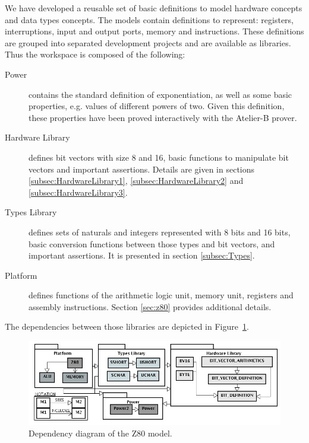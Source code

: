 \documentclass[a4paper]{llncs}
\begin{document}
We have developed a reusable set of basic definitions to model
hardware concepts and data types concepts. The models contain
definitions to represent: registers, interruptions, input and
output ports, memory and instructions. These definitions are grouped
into separated development projects and are available as libraries.
Thus the workspace is composed of the following: 
\begin{description}

\item[Power] contains the standard definition of exponentiation, as
  well as some basic properties, e.g. values of different powers of
  two. Given this definition, these properties have been proved
  interactively with the Atelier-B prover.

\item[Hardware Library] defines bit vectors with size 8 and 16, basic
  functions to manipulate bit vectors and important
  assertions. Details are given in sections
  \ref{subsec:HardwareLibrary1}, \ref{subsec:HardwareLibrary2} and
  \ref{subsec:HardwareLibrary3}.
 
\item[Types Library] defines sets of naturals and integers represented
  with 8 bits and 16 bits, basic conversion functions between those
  types and bit vectors, and important assertions. It is presented in
  section \ref{subsec:Types}.
 
\item[Platform] defines functions of the arithmetic logic unit, memory
  unit, registers and assembly instructions. Section \ref{sec:z80}
  provides additional details.
 
\end{description}

The dependencies between those libraries are depicted in
Figure~\ref{fig:hardware-definition-graph}.

\begin{figure}[h]
\centering
\includegraphics[width=.77\textwidth]{diagramaEstrutural_vertical_ProB.png}
 \caption{Dependency diagram of the Z80 model.}
\label{fig:hardware-definition-graph}
\end{figure}
\end{document}
